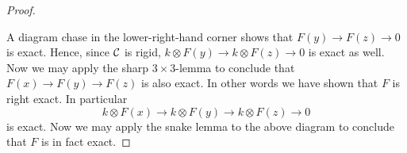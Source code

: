 \documentclass{amsart}
\begin{document}
\begin{proof}
\begin{center}
	\end{center}
	A diagram chase in the lower-right-hand corner shows that $F(y) \to F(z) \to 0$ is exact. Hence, since $\mathcal C$ is rigid,
		$k \otimes F(y) \to k \otimes F(z) \to 0$
	is exact as well. Now we may apply the sharp $3 \times 3$-lemma \cite[Lem. 2]{MR1004230} to conclude that $F(x) \to F(y) \to F(z)$ is also exact. In other words we have shown that $F$ is right exact. In particular
	\begin{equation*}
		k \otimes F(x) \to k \otimes F(y) \to k \otimes F(z) \to 0
	\end{equation*} 
	is exact. Now we may apply the snake lemma to the above diagram to conclude that $F$ is in fact exact. 
\end{proof}
\end{document}
